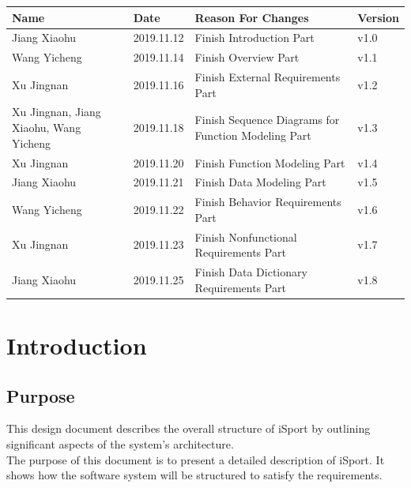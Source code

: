 \documentclass[16pt]{scrreprt}
\begin{document}
\begin{center}
    \begin{tabular}{|p{5cm}|p{3cm}|p{7cm}|p{2cm}|}
        \hline
	    Name & Date & Reason For Changes & Version\\
        \hline
	    Jiang Xiaohu & 2019.11.12 & Finish Introduction Part  & v1.0\\
        \hline
	    Wang Yicheng & 2019.11.14 & Finish Overview Part & v1.1\\
        \hline
        Xu Jingnan & 2019.11.16 & Finish External Requirements Part & v1.2\\
        \hline
        Xu Jingnan, Jiang Xiaohu, Wang Yicheng & 2019.11.18 & Finish Sequence Diagrams for Function Modeling Part& v1.3\\
        \hline
        Xu Jingnan & 2019.11.20 & Finish Function Modeling Part & v1.4\\
        \hline
        Jiang Xiaohu & 2019.11.21 & Finish Data Modeling Part  & v1.5\\
        \hline
        Wang Yicheng & 2019.11.22 & Finish Behavior Requirements Part & v1.6\\
        \hline
        Xu Jingnan & 2019.11.23 & Finish Nonfunctional Requirements Part & v1.7\\
        \hline
        Jiang Xiaohu & 2019.11.25 & Finish Data Dictionary Requirements Part & v1.8\\
        \hline
    \end{tabular}
\end{center}

\chapter{Introduction}

\section{Purpose}
This design document describes the overall structure of iSport by outlining significant aspects of the system’s architecture.\\

\noindent  The purpose of this document is to present a detailed description of iSport. It shows how the software system will be structured to satisfy the requirements.
\end{document}
